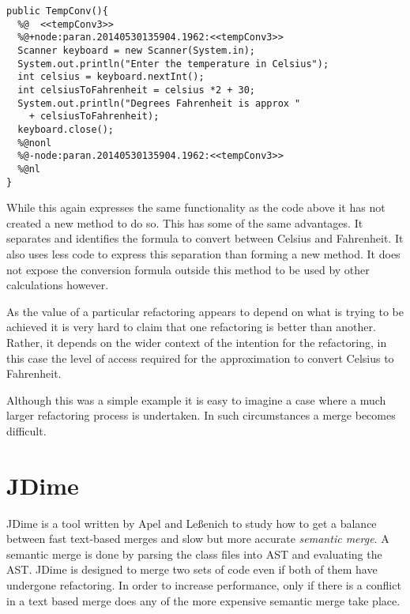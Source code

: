 \begin{minipage}[t]{1.0\textwidth}
\begin{lstlisting}
public TempConv(){
  %@  <<tempConv3>>
  %@+node:paran.20140530135904.1962:<<tempConv3>>
  Scanner keyboard = new Scanner(System.in);
  System.out.println("Enter the temperature in Celsius");
  int celsius = keyboard.nextInt();
  int celsiusToFahrenheit = celsius *2 + 30;
  System.out.println("Degrees Fahrenheit is approx " 
    + celsiusToFahrenheit);
  keyboard.close();
  %@nonl
  %@-node:paran.20140530135904.1962:<<tempConv3>>
  %@nl
}
\end{lstlisting}
\end{minipage}

While this again expresses the same functionality as the code above it has not created a new method to do so. This has some of the same advantages. It separates and identifies the formula to convert between Celsius and Fahrenheit. It also uses less code to express this separation than forming a new method. It does not expose the conversion formula outside this method to be used by other calculations however.

As the value of a particular refactoring appears to depend on what is trying to be achieved it is very hard to claim that one refactoring is better than another. Rather, it depends on the wider context of the intention for the refactoring, in this case the level of access required for the approximation to convert Celsius to Fahrenheit.

Although this was a simple example it is easy to imagine a case where a much larger refactoring process is undertaken. In such circumstances a merge becomes difficult. 

\section{JDime}
\label{sec:Jdime}
JDime is a tool written by  Apel and Le{\ss}enich \cite{Apel2012} \cite{Apel2011} \cite{LeBenich2012} to study how to get a balance between fast text-based merges and slow but more accurate \emph{semantic merge}.  
A semantic merge is done by parsing the class files into AST and evaluating the AST.
JDime is designed to merge two sets of code even if both of them have undergone refactoring. 
In order to increase performance, only if there is a conflict in a text based merge does any of the more expensive semantic merge take place. 

